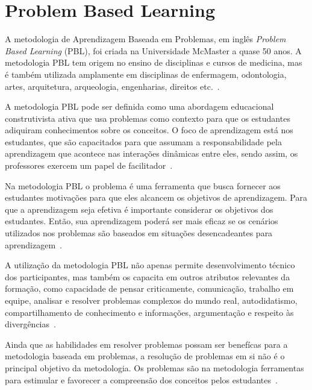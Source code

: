 \acresetall
\section{Problem Based Learning}

A metodologia de Aprendizagem Baseada em Problemas, em
inglês \textit{Problem Based Learning} (PBL),
foi criada na Universidade McMaster a quase 50 anos.
A metodologia PBL tem origem no ensino de disciplinas e cursos de medicina,
mas é também utilizada amplamente em disciplinas de enfermagem,
odontologia, artes, arquitetura, arqueologia, engenharias, direitos
etc.~\cite{albanese2010problem, amos1998problem}.

A metodologia PBL pode ser definida como uma abordagem educacional
construtivista ativa que usa problemas como contexto para que os estudantes
adiquiram conhecimentos sobre os conceitos. O foco de aprendizagem está
nos estudantes, que são capacitados para que assumam a responsabilidade pela
aprendizagem que acontece nas interações dinâmicas
entre eles, sendo assim, os professores exercem um papel
de facilitador~\cite{dolmans2005problem, albanese2010problem,
amos1998problem, forsythe2002problem}.

Na metodologia PBL o problema é uma ferramenta que busca fornecer
aos estudantes motivações para que eles alcancem os
objetivos de aprendizagem.
Para que a aprendizagem seja efetiva é importante considerar os objetivos
dos estudantes.
Então, sua aprendizagem poderá ser mais eficaz se os cenários utilizados
nos problemas são baseados em situações desencadeantes para
aprendizagem~\cite{wood2003problem, o2012practical, amos1998problem}.

A utilização da metodologia PBL não apenas permite desenvolvimento
técnico dos participantes, mas também os capacita em outros
atributos relevantes da formação, como capacidade de pensar
criticamente, comunicação, trabalho em equipe,
analisar e resolver problemas complexos do mundo real,
autodidatismo, compartilhamento de conhecimento e informações,
argumentação e respeito às
divergências~\cite{wood2003problem, savery2015overview}.

Ainda que as habilidades em resolver problemas possam ser benefícas
para a metodologia baseada em problemas, a resolução de problemas em si não é o
principal objetivo da metodologia.
Os problemas são na metodologia ferramentas para estimular e
favorecer a compreensão dos conceitos pelos
estudantes~\cite{wood2003problem, amos1998problem}.

